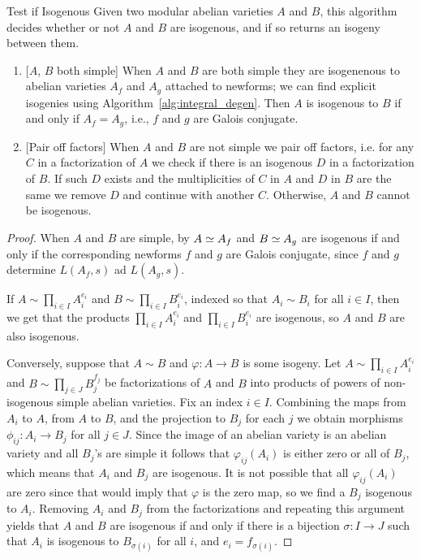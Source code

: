 \documentclass{article}
\begin{document}
\begin{algorithm}{Test if Isogenous}
    Given two modular abelian varieties $A$ and $B$, this
    algorithm decides whether or not $A$ and $B$ are isogenous, and if
    so returns an isogeny between them.

    \begin{enumerate}
        \item{} [$A$, $B$ both simple] When $A$ and $B$ are both simple they
            are isogenenous to abelian varieties $A_f$ and $A_g$ attached to
            newforms; we can find explicit isogenies using
            Algorithm~\ref{alg:integral_degen}.
            Then $A$ is isogenous to $B$ if and only if $A_f = A_g$, i.e., $f$
            and $g$ are Galois conjugate.


        \item{} [Pair off factors] When $A$ and $B$ are not simple we pair off
            factors, i.e. for any $C$ in a factorization of $A$ we check if
            there is an isogenous $D$ in a factorization of $B$. If such $D$
            exists and the multiplicities of $C$ in $ A$ and $D$ in $B$ are the
            same we remove $D$ and continue with another $C$. Otherwise, $A$ and
            $B$ cannot be isogenous.
    \end{enumerate}
\end{algorithm}
\begin{proof}
    When $A$ and $B$ are simple, by \cite[\S5]{faltings:finiteness:1986}
    $A\simeq A_f$ and $B\simeq A_g$ are isogenous if and only if the
    corresponding newforms $f$ and $g$ are Galois conjugate,
    since $f$ and $g$ determine $L(A_f,s)$ ad $L(A_g,s)$.

    If $A \sim \prod_{i \in I} A_i^{e_i}$ and $B \sim \prod_{i \in I}
    B_i^{e_i}$, indexed so that $A_i \sim B_i$ for all $i \in I$, then we
    get that the products $\prod_{i \in I} A_i^{e_i}$ and $\prod_{i \in I}
    B_i^{e_i}$ are isogenous, so $A$ and $B$ are also isogenous.

    Conversely, suppose that $A \sim B$ and $\varphi: A \to B$ is some
    isogeny.  Let $A \sim \prod_{i \in I} A_i^{e_i}$ and $B \sim
    \prod_{j \in J} B_j^{f_j}$ be factorizations of $A$ and $B$ into
    products of powers of non-isogenous simple abelian varieties. Fix an
    index $i \in I$.  Combining the maps from $A_i$ to $A$, from $A$ to
    $B$, and the projection to $B_j$ for each $j$ we obtain morphisms
    $\phi_{ij}: A_i \to B_j$ for all $j \in J$. Since the image of an
    abelian variety is an abelian variety and all $B_j$'s are simple it
    follows that $\varphi_{ij}(A_i)$ is either zero or all of $B_j$,
    which means that $A_i$ and $B_j$ are isogenous. It is not possible
    that all $\varphi_{ij}(A_i)$ are zero since that would imply that
    $\varphi$ is the zero map, so we find a $B_j$ isogenous to
    $A_i$. Removing $A_i$ and $B_j$ from the factorizations and
    repeating this argument yields that $A$ and $B$ are isogenous if and
    only if there is a bijection $\sigma:I\to J$ such that $A_i$ is
    isogenous to $B_{\sigma(i)}$ for all $i$, and $e_i = f_{\sigma(i)}$.
\end{proof}
\end{document}

